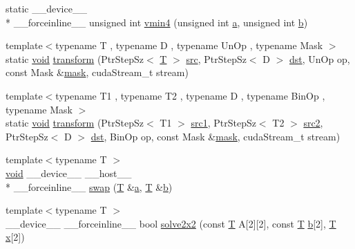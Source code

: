\begin{DoxyCompactItemize}
\item 
static \-\_\-\-\_\-device\-\_\-\-\_\- \\*
\-\_\-\-\_\-forceinline\-\_\-\-\_\- unsigned int \hyperlink{namespacecv_1_1gpu_1_1device_a3b5f88af2dcba64d6d15d5cb3000938f}{vmin4} (unsigned int \hyperlink{legacy_8hpp_a1031d0e0a97a340abfe0a6ab9e831045}{a}, unsigned int \hyperlink{legacy_8hpp_ac04272e8ca865b8fba18d36edae9fd2a}{b})
\item 
{\footnotesize template$<$typename T , typename D , typename Un\-Op , typename Mask $>$ }\\static \hyperlink{legacy_8hpp_a8bb47f092d473522721002c86c13b94e}{void} \hyperlink{namespacecv_1_1gpu_1_1device_a2be79f9aebc09e0a901fd11b120bb020}{transform} (Ptr\-Step\-Sz$<$ \hyperlink{calib3d_8hpp_a3efb9551a871ddd0463079a808916717}{T} $>$ \hyperlink{legacy_8hpp_a371cd109b74033bc4366f584edd3dacc}{src}, Ptr\-Step\-Sz$<$ D $>$ \hyperlink{photo__c_8h_aed13e2a25279b24dc954073233fef7a5}{dst}, Un\-Op op, const Mask \&\hyperlink{tracking_8hpp_a6b13ecd2fd6ec7ad422f1d7863c3ad19}{mask}, cuda\-Stream\-\_\-t stream)
\item 
{\footnotesize template$<$typename T1 , typename T2 , typename D , typename Bin\-Op , typename Mask $>$ }\\static \hyperlink{legacy_8hpp_a8bb47f092d473522721002c86c13b94e}{void} \hyperlink{namespacecv_1_1gpu_1_1device_a95c6c04f06b9512587c58e9bf0bbe8c9}{transform} (Ptr\-Step\-Sz$<$ T1 $>$ \hyperlink{core__c_8h_a897de4702c922f4cccda0d57ccdcafb3}{src1}, Ptr\-Step\-Sz$<$ T2 $>$ \hyperlink{core__c_8h_a7561a36d48069d54a6c8ac4e4750edfd}{src2}, Ptr\-Step\-Sz$<$ D $>$ \hyperlink{photo__c_8h_aed13e2a25279b24dc954073233fef7a5}{dst}, Bin\-Op op, const Mask \&\hyperlink{tracking_8hpp_a6b13ecd2fd6ec7ad422f1d7863c3ad19}{mask}, cuda\-Stream\-\_\-t stream)
\item 
{\footnotesize template$<$typename T $>$ }\\\hyperlink{legacy_8hpp_a8bb47f092d473522721002c86c13b94e}{void} \-\_\-\-\_\-device\-\_\-\-\_\- \-\_\-\-\_\-host\-\_\-\-\_\- \\*
\-\_\-\-\_\-forceinline\-\_\-\-\_\- \hyperlink{namespacecv_1_1gpu_1_1device_a899a4194a9f1e46cf120982057b3d32b}{swap} (\hyperlink{calib3d_8hpp_a3efb9551a871ddd0463079a808916717}{T} \&\hyperlink{legacy_8hpp_a1031d0e0a97a340abfe0a6ab9e831045}{a}, \hyperlink{calib3d_8hpp_a3efb9551a871ddd0463079a808916717}{T} \&\hyperlink{legacy_8hpp_ac04272e8ca865b8fba18d36edae9fd2a}{b})
\item 
{\footnotesize template$<$typename T $>$ }\\\-\_\-\-\_\-device\-\_\-\-\_\- \-\_\-\-\_\-forceinline\-\_\-\-\_\- bool \hyperlink{namespacecv_1_1gpu_1_1device_a95f5310328ba4279fa4d83a2c6c6ee3a}{solve2x2} (const \hyperlink{calib3d_8hpp_a3efb9551a871ddd0463079a808916717}{T} A\mbox{[}2\mbox{]}\mbox{[}2\mbox{]}, const \hyperlink{calib3d_8hpp_a3efb9551a871ddd0463079a808916717}{T} \hyperlink{legacy_8hpp_ac04272e8ca865b8fba18d36edae9fd2a}{b}\mbox{[}2\mbox{]}, \hyperlink{calib3d_8hpp_a3efb9551a871ddd0463079a808916717}{T} \hyperlink{highgui__c_8h_a6150e0515f7202e2fb518f7206ed97dc}{x}\mbox{[}2\mbox{]})

\end{DoxyCompactItemize}
